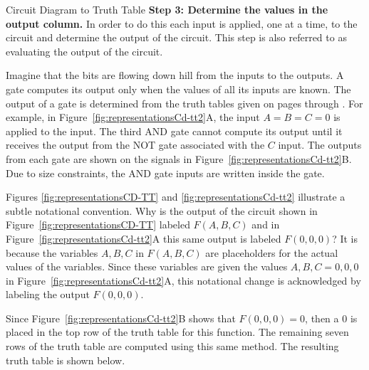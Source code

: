 \begin{process}{Circuit Diagram to Truth Table}
    \textbf{Step 3: Determine the values in the output column. }
    In order to do this each input is applied, one at a time, to
    the circuit and determine the output of the circuit.  This step is also
    referred to as evaluating the output of the circuit.

    Imagine that
    the bits are flowing down hill from the inputs to the outputs.  A
    gate computes its output only when the values of all its inputs
    are known.  The output of a gate is determined from the truth tables
    given on pages \pageref{page:elf1} through \pageref{page:elf2}.  For example,
    in Figure~\ref{fig:representationsCd-tt2}A, the input $A=B=C=0$ is applied
    to the input.  The third AND gate cannot compute its output until
    it receives the output from the NOT gate associated with the $C$
    input.  The outputs from each gate are shown on the signals in
    Figure~\ref{fig:representationsCd-tt2}B.  Due to size constraints, the AND gate
    inputs are written inside the gate.

    {\setlength{\fboxsep}{0pt}
        \centering
\par}\vspace{0.2cm}

Figures \ref{fig:representationsCD-TT} and \ref{fig:representationsCd-tt2}
illustrate a subtle notational convention.
Why is the output of the circuit shown in Figure~\ref{fig:representationsCD-TT}
labeled $F(A,B,C)$ and in Figure~\ref{fig:representationsCd-tt2}A this same output is
labeled  $F(0,0,0)$?  It is because the variables $A,B,C$ in $F(A,B,C)$
are placeholders for the actual values of the variables.  Since these
variables are given the values $A,B,C = 0,0,0$ in Figure~\ref{fig:representationsCd-tt2}A,
this notational change is acknowledged by labeling the output $F(0,0,0)$.

Since Figure~\ref{fig:representationsCd-tt2}B shows that $F(0,0,0) = 0$, then
a 0 is placed in the top row of the truth table for this
function.  The remaining seven rows of the truth table are computed
using this same method.  The resulting truth table is shown below.


\end{process}
